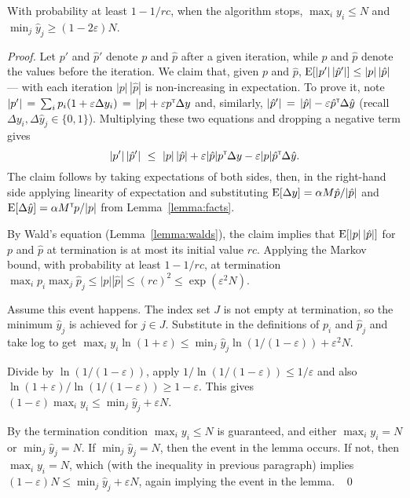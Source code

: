 \documentclass[11pt]{svjour3} \usepackage{fullpage}
\newcommand{\primalOf}[1]{{{#1}}}
\newcommand{\dualOf}[1]{{\hat{#1}}}
\newcommand{\MM}{M}
\newcommand{\JJ}{J}
\newcommand{\yp}{\primalOf y}
\newcommand{\pp}{\primalOf p}
\newcommand{\yd}{\dualOf y}
\newcommand{\pd}{\dualOf p}
\newenvironment{Proof}{\begin{proof}}{{} ~\hfill\hfill\qed~\end{proof}}
\newcommand{\eps}{\varepsilon}
\newcommand{\tran}{^{\scriptscriptstyle \sf T\hspace*{-0.05em}}}
\newcommand{\E}{{\rm E}}
\newcommand{\rows}{r}
\newcommand{\columns}{c}
\begin{document}
\begin{lemma} \label{lemma:lyapunov}
With probability at least $1-1/\rows\columns$,
when the algorithm stops,
$\max_i \yp_i  \le N$ and $\min_j \yd_j \ge (1-2\eps)N$.
\end{lemma}
\begin{Proof} 
Let $\pp'$ and $\pd'$ denote $\pp$ and $\pd$ after a given iteration,
while $\pp$ and $\pd$ denote the values before the iteration.
We claim that, given $\pp$ and $\pd$, 
$\E[|\pp'|\,|\pd'|] \le |\pp|\,|\pd|$
--- with each iteration $|\pp|\,|\pd|$ is non-increasing in expectation.
To prove it, note
\(
|\pp'| \,=\,
\sum_{i} \pp_i(1+\eps \Delta\yp_i)
\,=\,
|\pp| + \eps \pp\tran\Delta\yp
\)
and, similarly,
\(
|\pd'| \,=\,|\pd| - \eps \pd\tran\Delta\yd
\)
(recall $\Delta\yp_i,\Delta\yd_j \in \{0,1\}$).
Multiplying these two equations
and dropping a negative term gives
\[
|\pp'|\,|\pd'| ~\le~
|\pp|\,|\pd|
 + \eps |\pd|\pp\tran\Delta\yp
 - \eps |\pp|\pd\tran\Delta\yd.
\]
The claim follows by taking expectations of both sides,
then, in the right-hand side applying linearity of expectation and
substituting
 $\E[\Delta \yp] = \alpha\MM\pd/|\pd|$
and
 $\E[\Delta \yd] = \alpha\MM\tran\pp/|\pp|$
from Lemma~\ref{lemma:facts}.

By Wald's equation (Lemma~\ref{lemma:walds}),
the claim implies that $\E[|\pp|\,|\pd|]$ for $\pp$ and $\pd$ at termination
is at most its initial value $\rows\columns$.
Applying the Markov bound, with probability at least $1-1/\rows\columns$,
at termination $\max_i \pp_i \max_j \pd_j \le |\pp||\pd| \le (\rows\columns)^2 \le \exp(\eps^2 N)$.

Assume this event happens.
The index set $\JJ$ is not empty at termination, so the minimum
$\yd_j$ is achieved for $j\in\JJ$.
Substitute in the definitions of $\pp_i$ and $\pd_j$
and take log to get
$\max_i \yp_i\ln(1+\eps)  
\le \min_j \yd_j\ln(1/(1-\eps)) + \eps^2 N$.

Divide by $\ln(1/(1-\eps))$, apply
$1/\ln(1/(1-\eps))\le 1/\eps$
and also
$\ln(1+\eps)/\ln(1/(1-\eps))\ge 1-\eps$.
This gives
$(1-\eps) \max_i \yp_i 
\le \min_j \yd_j + \eps N$.

By the termination condition $\max_i\yp_i\le N$ is guaranteed,
and either  $\max_i\yp_i=N$ or $\min_j\yd_j = N$.
If $\min_j\yd_j = N$, then the event in the lemma occurs.
If not, then $\max_i\yp_i=N$, 
which (with the inequality in previous paragraph) 
implies $(1-\eps) N \le \min_j\yd_j + \eps N$,
again implying the event in the lemma.
\end{Proof}
\end{document}
